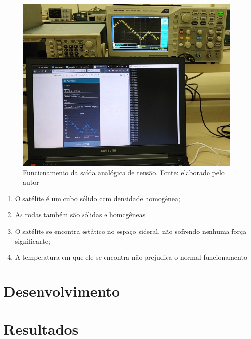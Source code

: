 \documentclass[journal]{IEEEtranTIE}
\begin{document}
\begin{figure}[H]
	\includegraphics[width=\linewidth]{img/real_running.png}
    \caption{Funcionamento da saída analógica de tensão. Fonte: elaborado pelo autor}
    \label{fig:real}
\end{figure}


 \begin{enumerate}[1.]
   	 	\item O satélite é um cubo sólido com densidade homogênea;
   	 	\item As rodas também são sólidas e homogêneas;
   	 	\item O satélite se encontra estático no espaço sideral, não sofrendo nenhuma força significante;
   		\item A temperatura em que ele se encontra não prejudica o normal funcionamento
\end{enumerate}


\section{Desenvolvimento}



\section{Resultados}
\end{document}
